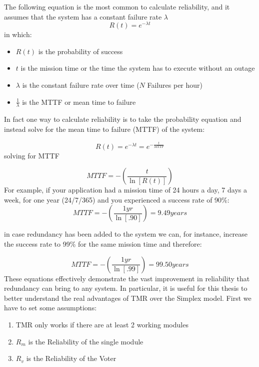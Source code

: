 \documentclass[./dissertation.tex]{subfiles}
\begin{document}
The following equation is the most common to calculate reliability, and it assumes that the system has a constant failure rate $\lambda$
\begin{equation}
    R(t) = e^{-\lambda t}
\end{equation}
in which:
\begin{itemize}
    \item $R(t)$ is the probability of success
    \item $t$ is the mission time or the time the system has to execute without an outage
    \item $\lambda$ is the constant failure rate over time ($N$ Failures per hour)
    \item $\frac{1}{\lambda}$ is the MTTF or mean time to failure
\end{itemize}

In fact one way  to calculate reliability is to take the probability equation and instead solve for the mean time to failure (MTTF) of the
system:

\begin{equation}
    R(t) = e^{-\lambda t } = e^{-\frac{t}{MTTF}}
\end{equation}
solving for MTTF

\begin{equation}
    MTTF = -\left( \frac{t}{\ln{[R(t)]}} \right)
\end{equation}
For example, if your application had a mission time of 24 hours a day, 7 days a week, for one year (24/7/365) and you experienced a
success rate of 90\%:
\begin{equation}
    MTTF = -\left( \frac{1yr}{\ln[.90]} \right) = 9.49 years
\end{equation}

in case redundancy has been added to the system we can, for instance, increase the success rate to 99\% for the same mission time and therefore:

\begin{equation}
    MTTF = -\left( \frac{1yr}{\ln[.99]} \right) = 99.50 years
\end{equation}
These equations effectively demonstrate the vast improvement in reliability that redundancy can bring to any system.
\newpage
In particular, it is useful for this thesis to better understand the real advantages of TMR over the Simplex model. First we have to set some assumptions:
\begin{enumerate}
    \item TMR only works if there are at least 2 working modules
    \item $R_m$ is the Reliability of the single module
    \item $R_v$ is the Reliability of the Voter
\end{enumerate}
\end{document}
